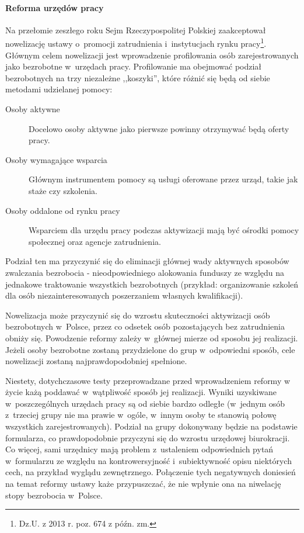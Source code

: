 \documentclass[12pt]{article}
\begin{document}
    \paragraph{Reforma urzędów pracy}
    
    Na przełomie zeszłego roku Sejm Rzeczypospolitej Polskiej zaakceptował nowelizację ustawy o~promocji zatrudnienia i~instytucjach rynku pracy\footnote{Dz.U. z 2013 r. poz. 674 z późn. zm.}. Głównym celem nowelizacji jest wprowadzenie profilowania osób zarejestrowanych jako bezrobotne w~urzędach pracy. Profilowanie ma obejmować podział bezrobotnych na trzy niezależne ,,koszyki'', które różnić się będą od siebie metodami udzielanej pomocy:
    
    \begin{description}
        \item[Osoby aktywne] Docelowo osoby aktywne jako pierwsze powinny otrzymywać będą oferty pracy. 
        \item[Osoby wymagające wsparcia] Głównym instrumentem pomocy są usługi oferowane przez urząd, takie jak staże czy szkolenia.
        \item[Osoby oddalone od rynku pracy] Wsparciem dla urzędu pracy podczas aktywizacji mają być ośrodki pomocy społecznej oraz agencje zatrudnienia.
    \end{description}

    Podział ten ma przyczynić się do eliminacji głównej wady aktywnych sposobów zwalczania bezrobocia - nieodpowiedniego alokowania funduszy ze względu na jednakowe traktowanie wszystkich bezrobotnych (przykład: organizowanie szkoleń dla osób niezainteresowanych poszerzaniem własnych kwalifikacji). 
    
    Nowelizacja może przyczynić się do wzrostu skuteczności aktywizacji osób bezrobotnych w~Polsce, przez co odsetek osób pozostających bez zatrudnienia obniży się. Powodzenie reformy zależy w~głównej mierze od sposobu jej realizacji. Jeżeli osoby bezrobotne zostaną przydzielone do grup w~odpowiedni sposób, cele nowelizacji zostaną najprawdopodobniej spełnione. 
    
    Niestety, dotychczasowe testy przeprowadzane przed wprowadzeniem reformy w życie każą poddawać w~wątpliwość sposób jej realizacji. Wyniki uzyskiwane w~poszczególnych urzędach pracy są od siebie bardzo odległe (w~jednym osób z~trzeciej grupy nie ma prawie w~ogóle, w~innym osoby te stanowią połowę wszystkich zarejestrowanych). Podział na grupy dokonywany będzie na podstawie formularza, co prawdopodobnie przyczyni się do wzrostu urzędowej biurokracji. Co więcej, sami urzędnicy mają problem z~ustaleniem odpowiednich pytań w~formularzu ze względu na kontrowersyjność i~subiektywność opisu niektórych cech, na przykład wyglądu zewnętrznego. Połączenie tych negatywnych doniesień na temat reformy ustawy każe przypuszczać, że nie wpłynie ona na niwelację stopy bezrobocia w~Polsce.
        
\end{document}
